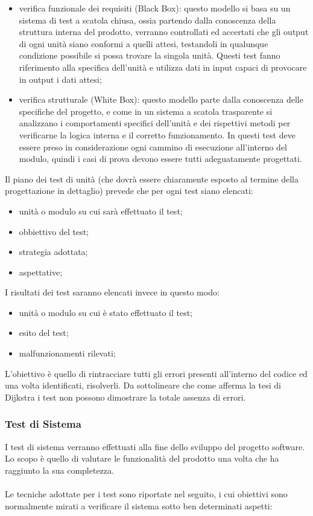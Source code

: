 \begin{itemize}
  \item verifica funzionale dei requisiti (Black Box): questo modello si basa su
  un sistema di test a scatola chiusa, ossia partendo dalla conoscenza della struttura interna del 
prodotto, verranno controllati ed accertati che gli output di ogni unit\`a siano  conformi 
a quelli attesi, testandoli in qualunque condizione possibile si possa trovare la singola 
unit\`a. Questi test fanno riferimento alla specifica dell'unit\`a e utilizza
dati in input capaci di provocare in output i dati attesi;
  \item verifica strutturale (White Box): questo modello parte dalla conoscenza 
  delle specifiche del progetto, e come in un sistema a scatola trasparente si analizzano i 
comportamenti specifici dell'unit\`a e dei rispettivi metodi per verificarne la logica 
interna e il corretto funzionamento. In questi test deve essere preso in considerazione 
ogni cammino di esecuzione all'interno del modulo, quindi i casi di prova devono essere 
tutti adeguatamente progettati. 
\end{itemize}


Il piano dei test di unit\`a (che dovr\`a essere chiaramente esposto al termine
della progettazione in dettaglio) prevede che per ogni test siano elencati:

\begin{itemize}
  \item unit\`a o modulo su cui sar\`a effettuato il test;
  \item obbiettivo del test;
  \item strategia adottata;
  \item aspettative;
\end{itemize}

I risultati dei test saranno elencati invece in questo modo:
\begin{itemize}
  \item unit\`a o modulo su cui \`e stato effettuato il test;
  \item esito del test;
  \item malfunzionamenti rilevati;
\end{itemize}

L'obiettivo \`e quello di rintracciare tutti gli errori presenti all'interno del
codice ed una volta identificati, risolverli. Da sottolineare che come afferma la tesi di Dijkstra 
i test non possono dimostrare la totale assenza di errori.

\subsubsection*{Test di Sistema}
I test di sistema verranno effettuati alla fine dello sviluppo del progetto
software. Lo scopo \`e quello di valutare le funzionalit\`a del prodotto una volta 
che ha raggiunto la sua completezza.\\ \\ 
Le tecniche adottate per i test sono riportate nel seguito, i cui obiettivi sono 
normalmente mirati a verificare il sistema sotto ben determinati aspetti:

